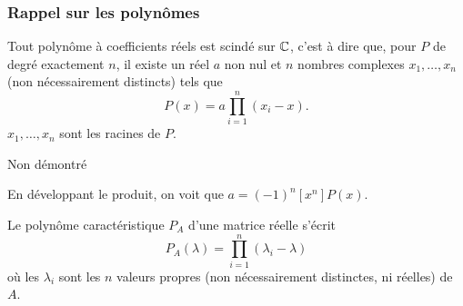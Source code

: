 \eproof

\subsubsection{Rappel sur les polynômes} 

\begin{proposition}
  Tout polynôme à coefficients réels est scindé sur $\mathbb{C}$, c'est à dire que, pour $P$ de degré exactement $n$, il existe un réel $a$ non nul et $n$ nombres complexes $x_1, \dots, x_n$ (non nécessairement distincts) tels que
  $$
  P(x) = a \prod_{i=1}^n (x_i - x).
  $$
  $x_1, \dots, x_n$ sont les racines de $P$.
\end{proposition}

\proof
Non démontré
\eproof

\remark
En développant le produit, on voit que $a = (-1)^n [x^n] P(x)$.

\begin{corollary*} %
  Le polynôme caractéristique $P_A$ d'une matrice réelle s'écrit
  $$
  P_A(\lambda) = \prod_{i=1}^n (\lambda_i - \lambda)
  $$
  où les $\lambda_i$ sont les $n$ valeurs propres (non nécessairement distinctes, ni réelles) de $A$.
\end{corollary*}

